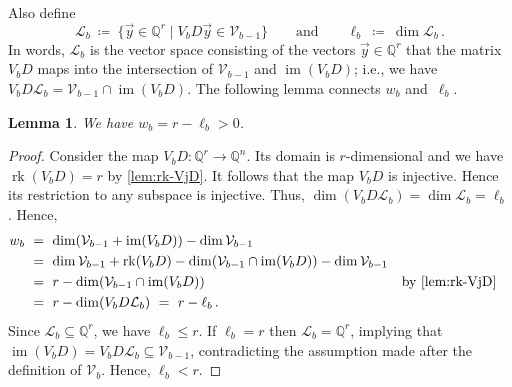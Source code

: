 \documentclass{lmcs}
\newtheorem{lemma}[thm]{Lemma}
\theoremstyle{definition}
\DeclareMathOperator{\im}{im}
\newcommand{\rk}{\operatorname{rk}}
\newcommand{\cL}{\mathcal{L}}
\newcommand{\Q}{\mathbb{Q}}
\newcommand{\V}{\mathcal{V}}
\begin{document}
Also define
\[
 \cL_b \ \coloneqq \ \{\vec{y} \in \Q^r \mid V_b D \vec{y} \in \V_{b-1}\} \qquad \text{and} \qquad \ell_b \ \coloneqq \ \dim \cL_b\,.
\]
In words, $\cL_b$ is the vector space consisting of the vectors $\vec{y} \in \Q^{r}$ that the matrix~$V_b D$ maps into the intersection of $\V_{b-1}$ and $\im(V_b D)$; i.e., we have
$
 V_b D \cL_b = \V_{b-1} \cap \im (V_b D)
$.
The following lemma connects $w_b$ and~$\ell_b$.
\begin{lemma} \label{lem:lw}
We have $w_b = r -\ell_b > 0$.
\end{lemma}
\begin{proof}
Consider the map $V_b D : \Q^r \to \Q^n$.
Its domain is $r$-dimensional and we have $\rk (V_b D) = r$ by \cref{lem:rk-VjD}.
It follows that the map $V_b D$ is injective.
Hence its restriction to any subspace is injective.
Thus, $\dim (V_b D \cL_b) = \dim \cL_b = \ell_b$.
Hence, 
\begin{align*}
w_b \ &= \ \dim(\V_{b-1} + \im(V_b D)) - \dim \V_{b-1} \\ 
&= \ \dim \V_{b-1} + \rk(V_b D) - \dim (\V_{b-1} \cap \im (V_b D)) - \dim \V_{b-1} \\
&= \ r - \dim (\V_{b-1} \cap \im (V_b D)) && \text{by \cref{lem:rk-VjD}}\\
&= \ r - \dim (V_b D \cL_b) \ = \ r - \ell_b\,.
\end{align*}
Since $\cL_b \subseteq \Q^r$, we have $\ell_b \le r$.
If $\ell_b = r$ then $\cL_b = \Q^r$, implying that $\im (V_b D) = V_b D \cL_b \subseteq \V_{b-1}$, contradicting the assumption made after the definition of $\V_{b}$.
Hence, $\ell_b < r$.
\end{proof}
\end{document}
